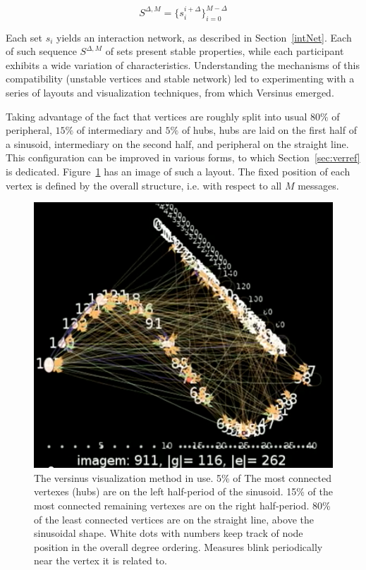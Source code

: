 \begin{equation}
	S^{\Delta,M}=\{s_i^{i+\Delta}\}_{i=0}^{M-\Delta}
\end{equation}

Each set $s_i$ yields an interaction network, as described in Section~\ref{intNet}.
Each of such sequence $S^{\Delta,M}$ of sets present stable properties,
while each participant exhibits a wide variation of characteristics.
Understanding the mechanisms of this compatibility (unstable vertices and stable network)
led to experimenting with a series of layouts and visualization techniques, from which Versinus emerged.

Taking advantage of the fact that vertices are roughly split into usual $80\%$ of peripheral, $15\%$ of intermediary and $5\%$ of hubs,
hubs are laid on the first half of a sinusoid,
intermediary on the second half,
and peripheral on the straight line.
This configuration can be improved in various forms, to which Section~\ref{sec:verref} is dedicated.
Figure~\ref{fig:versinus} has an image of such a layout.
The fixed position of each vertex is defined by the overall structure,
i.e. with respect to all $M$ messages.

\begin{figure}[h!]
	\begin{center}
		\includegraphics[scale=.25]{figs/versinus_}
				    \caption{The versinus visualization method in use. 5\% of The most connected vertexes (hubs) are on the left half-period of the sinusoid.
				    15\% of the most connected remaining vertexes are on the right half-period.
				    80\% of the least connected vertices are on the straight line, above the sinusoidal shape.
				    White dots with numbers keep track of node position in the overall degree ordering.
				    Measures blink periodically near the vertex it is related to.}
					    \label{fig:versinus}
	\end{center}
\end{figure}


